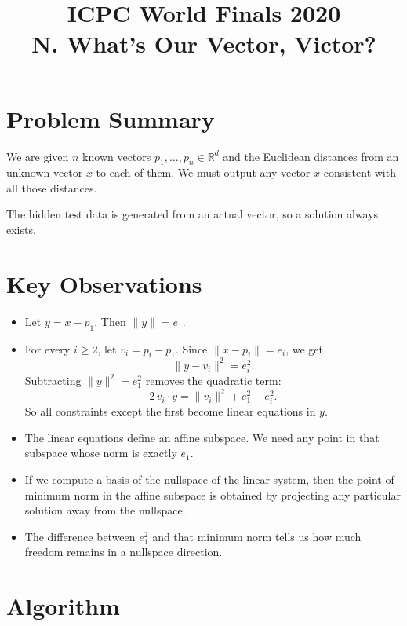 \documentclass[11pt]{article}
\title{ICPC World Finals 2020\\N. What’s Our Vector, Victor?}
\author{}
\date{}
\begin{document}
\maketitle

\section*{Problem Summary}

We are given $n$ known vectors $p_1,\dots,p_n \in \mathbb{R}^d$ and the Euclidean distances from an
unknown vector $x$ to each of them. We must output any vector $x$ consistent with all those distances.

The hidden test data is generated from an actual vector, so a solution always exists.

\section*{Key Observations}

\begin{itemize}[leftmargin=*]
    \item Let $y = x - p_1$. Then $\|y\| = e_1$.
    \item For every $i \ge 2$, let $v_i = p_i - p_1$. Since $\|x-p_i\| = e_i$, we get
    \[
        \|y - v_i\|^2 = e_i^2.
    \]
    Subtracting $\|y\|^2 = e_1^2$ removes the quadratic term:
    \[
        2\,v_i \cdot y = \|v_i\|^2 + e_1^2 - e_i^2.
    \]
    So all constraints except the first become linear equations in $y$.
    \item The linear equations define an affine subspace. We need any point in that subspace whose norm is
    exactly $e_1$.
    \item If we compute a basis of the nullspace of the linear system, then the point of minimum norm in the
    affine subspace is obtained by projecting any particular solution away from the nullspace.
    \item The difference between $e_1^2$ and that minimum norm tells us how much freedom remains in a
    nullspace direction.
\end{itemize}

\section*{Algorithm}
\end{document}
